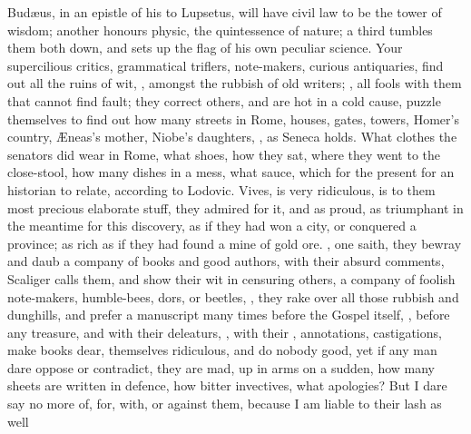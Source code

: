 {Bud\ae{}us, in an epistle of his to Lupsetus, will have civil law to be
the tower of wisdom; another honours physic, the quintessence of
nature; a third tumbles them both down, and sets up the flag of his own
peculiar science. Your supercilious critics, grammatical triflers,
note-makers, curious antiquaries, find out all the ruins of wit,
, amongst the rubbish of old writers; , all fools with them that cannot find fault;
they correct others, and are hot in a cold cause, puzzle themselves to
find out how many streets in Rome, houses, gates, towers, Homer's
country, \AE{}neas's mother, Niobe's daughters,  , as Seneca holds. What clothes the
senators did wear in Rome, what shoes, how they sat, where they went to
the close-stool, how many dishes in a mess, what sauce, which for the
present for an historian to relate, according to Lodovic. Vives,
is very ridiculous, is to them most precious elaborate stuff, they
admired for it, and as proud, as triumphant in the meantime for this
discovery, as if they had won a city, or conquered a province; as rich
as if they had found a mine of gold ore. , one saith, they bewray and daub
a company of books and good authors, with their absurd comments,
 Scaliger calls them, and show their wit
in censuring others, a company of foolish note-makers, humble-bees,
dors, or beetles, , they rake over
all those rubbish and dunghills, and prefer a manuscript many times
before the Gospel itself, , before any treasure,
and with their deleaturs, , with
their , annotations, castigations, \etc{} make books
dear, themselves ridiculous, and do nobody good, yet if any man dare
oppose or contradict, they are mad, up in arms on a sudden, how many
sheets are written in defence, how bitter invectives, what apologies?
 But I dare say no more of,
for, with, or against them, because I am liable to their lash as well
}
